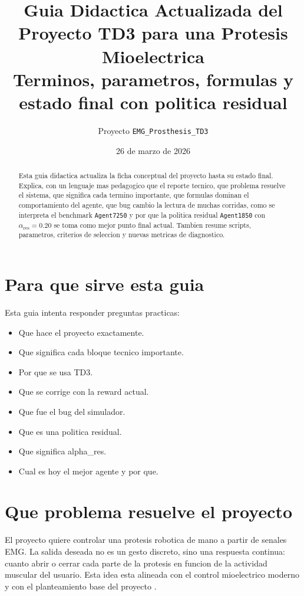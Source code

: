 \documentclass[11pt,a4paper]{article}
\title{\textbf{Guia Didactica Actualizada del Proyecto TD3 para una Protesis Mioelectrica}\\
\large Terminos, parametros, formulas y estado final con politica residual}
\author{Proyecto \texttt{EMG\_Prosthesis\_TD3}}
\date{26 de marzo de 2026}
\begin{document}
\maketitle

\begin{abstract}
Esta guia didactica actualiza la ficha conceptual del proyecto hasta su estado final. Explica, con un lenguaje mas pedagogico que el reporte tecnico, que problema resuelve el sistema, que significa cada termino importante, que formulas dominan el comportamiento del agente, que bug cambio la lectura de muchas corridas, como se interpreta el benchmark \texttt{Agent7250} y por que la politica residual \texttt{Agent1850} con \(\alpha_{\mathrm{res}} = 0.20\) se toma como mejor punto final actual. Tambien resume scripts, parametros, criterios de seleccion y nuevas metricas de diagnostico.
\end{abstract}

\tableofcontents
\newpage

\section{Para que sirve esta guia}

Esta guia intenta responder preguntas practicas:
\begin{itemize}[leftmargin=1.5em]
\item Que hace el proyecto exactamente.
\item Que significa cada bloque tecnico importante.
\item Por que se usa TD3.
\item Que se corrige con la reward actual.
\item Que fue el bug del simulador.
\item Que es una politica residual.
\item Que significa alpha\_res.
\item Cual es hoy el mejor agente y por que.
\end{itemize}

\section{Que problema resuelve el proyecto}

El proyecto quiere controlar una protesis robotica de mano a partir de senales EMG. La salida deseada no es un gesto discreto, sino una respuesta continua: cuanto abrir o cerrar cada parte de la protesis en funcion de la actividad muscular del usuario. Esta idea esta alineada con el control mioelectrico moderno \citep{chen2023review} y con el planteamiento base del proyecto \citep{fuertes2026continuous}.
\end{document}
